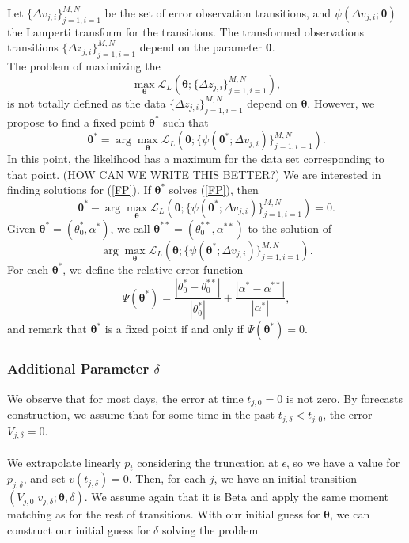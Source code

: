 \documentclass[11pt]{article}
\theoremstyle{definition}
\begin{document}
Let $\{\Delta v_{j,i}\}_{j=1,i=1}^{M,N}$ be the set of error observation transitions, and $\psi(\Delta v_{j,i};\bm{\theta})$ the Lamperti transform for the transitions. The transformed observations transitions $\{\Delta z_{j,i}\}_{j=1,i=1}^{M,N}$ depend on the parameter $\bm{\theta}$.\\
The problem of maximizing the  $$\max_{\bm{\theta}}\mathcal{L}_L\left(\bm{\theta};\{\Delta z_{j,i}\}_{j=1,i=1}^{M,N}\right),$$
is not totally defined as the data $\{\Delta z_{j,i}\}_{j=1,i=1}^{M,N}$ depend on $\bm{\theta}$. However, we propose to find a fixed point $\bm{\theta}^*$ such that
\begin{equation}
\bm{\theta}^*=\arg\max_{\bm{\theta}}\mathcal{L}_L\left(\bm{\theta};\{\psi(\bm{\theta}^*;\Delta v_{j,i})\}_{j=1,i=1}^{M,N}\right).
\label{FP}
\end{equation}
{\color{red}In this point, the likelihood has a maximum for the data set corresponding to that point. (HOW CAN WE WRITE THIS BETTER?)}
We are interested in finding solutions for (\ref{FP}). If $\bm{\theta}^*$ solves (\ref{FP}), then
\begin{equation*}
\bm{\theta}^*-\arg\max_{\bm{\theta}}\mathcal{L}_L\left(\bm{\theta};\{\psi(\bm{\theta}^*;\Delta v_{j,i})\}_{j=1,i=1}^{M,N}\right)=0.
\end{equation*}
Given $\bm{\theta}^*=(\theta_0^*,\alpha^*)$, we call $\bm{\theta}^{**}=(\theta_0^{**},\alpha^{**})$ to the solution of
\begin{equation*}
\arg\max_{\bm{\theta}}\mathcal{L}_L\left(\bm{\theta};\{\psi(\bm{\theta}^*;\Delta v_{j,i})\}_{j=1,i=1}^{M,N}\right).
\end{equation*}
For each $\bm{\theta}^*$, we define the relative error function
\begin{equation}
\Psi(\bm{\theta}^*)=\frac{|\theta_0^{*}-\theta_0^{**}|}{|\theta_0^{*}|}+\frac{|\alpha^{*}-\alpha^{**}|}{|\alpha^{*}|},
\label{eq:rel_error}
\end{equation}
and remark that $\bm{\theta}^*$ is a fixed point if and only if $\Psi(\bm{\theta}^*)=0$.

\subsubsection{Additional Parameter $\delta$}

We observe that for most days, the error at time $t_{j,0}=0$ is not zero. By forecasts construction, we assume that for some time in the past $t_{j,\delta}<t_{j,0}$, the error $V_{j,\delta}=0$.\\
\quad\\
We extrapolate linearly $p_t$ considering the truncation at $\epsilon$, so we have a value for $p_{j,\delta}$, and set $v(t_{j,\delta})=0$. Then, for each $j$, we have an initial transition $(V_{j, 0}|v_{j,\delta};\bm{\theta},\delta)$. We assume again that it is Beta and apply the same moment matching as for the rest of transitions. With our initial guess for $\bm{\theta}$, we can construct our initial guess for $\delta$ solving the problem
\end{document}
